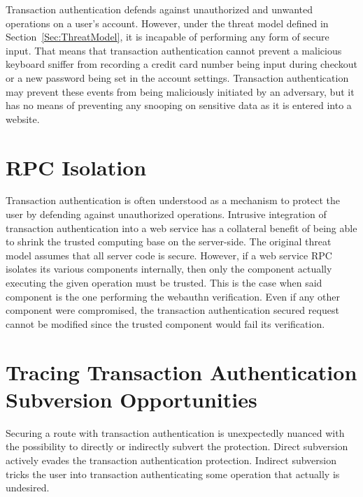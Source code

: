 Transaction authentication defends against unauthorized and unwanted operations on a user's account. However, under the threat model defined in Section~\ref{Sec:ThreatModel}, it is incapable of performing any form of secure input. That means that transaction authentication cannot prevent a malicious keyboard sniffer from recording a credit card number being input during checkout or a new password being set in the account settings. Transaction authentication may prevent these events from being maliciously initiated by an adversary, but it has no means of preventing any snooping on sensitive data as it is entered into a website.

\section{RPC Isolation}

Transaction authentication is often understood as a mechanism to protect the user by defending against unauthorized operations. Intrusive integration of transaction authentication into a web service has a collateral benefit of being able to shrink the trusted computing base on the server-side. The original threat model assumes that all server code is secure. However, if a web service RPC isolates its various components internally, then only the component actually executing the given operation must be trusted. This is the case when said component is the one performing the webauthn verification. Even if any other component were compromised, the transaction authentication secured request cannot be modified since the trusted component would fail its verification.



\section{Tracing Transaction Authentication \newline Subversion Opportunities}

Securing a route with transaction authentication is unexpectedly nuanced with the possibility to directly or indirectly subvert the protection. Direct subversion actively evades the transaction authentication protection. Indirect subversion tricks the user into transaction authenticating some operation that actually is undesired.

